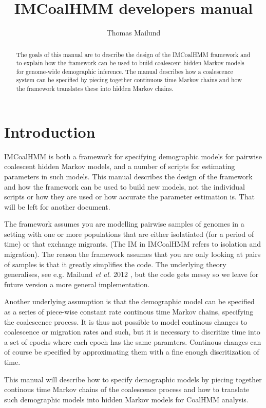 \documentclass[11pt]{article}
\title{IMCoalHMM developers manual}
\author{Thomas Mailund}
\begin{document}
\maketitle

\begin{abstract}
    The goals of this manual are to describe the design of the IMCoalHMM framework and to explain how the framework can be used to build coalescent hidden Markov models for genome-wide demographic inference. The manual describes how a coalescence system can be specified by piecing together continuous time Markov chains and how the framework translates these into hidden Markov chains.
\end{abstract}

\section{Introduction}

IMCoalHMM is both a framework for specifying demographic models for pairwise coalescent hidden Markov models, and a number of scripts for estimating parameters in such models. This manual describes the design of the framework and how the framework can be used to build new models, not the individual scripts or how they are used or how accurate the parameter estimation is. That will be left for another document.

The framework assumes you are modelling pairwise samples of genomes in a setting with one or more populations that are either isolatiated (for a period of time) or that exchange migrants. (The IM in IMCoalHMM refers to isolation and migration). The reason the framework assumes that you are only looking at pairs of samples is that it greatly simplifies the code. The underlying theory generalises, see e.g. Mailund \emph{et al.} 2012 \cite{springerlink:10.1007/978-3-642-31131-4_3}, but the code gets messy so we leave for future version a more general implementation.

Another underlying assumption is that the demographic model can be specified as a series of piece-wise constant rate continous time Markov chains, specifying the coalescence process. It is thus not possible to model continous changes to coalescence or migration rates and such, but it is necessary to discritize time into a set of epochs where each epoch has the same paramters. Continous changes can of course be specified by approximating them with a fine enough discritization of time.

This manual will describe how to specify demographic models by piecing together continous time Markov chains of the coalescence process and how to translate such demographic models into hidden Markov models for CoalHMM analysis.
\end{document}
